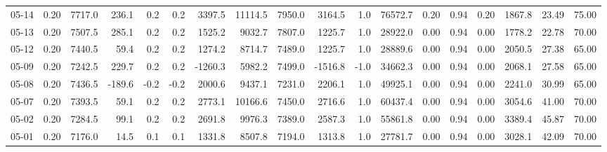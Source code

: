 \begin{threeparttable}
{\begin{tabular}{lrrrrrrrrrrrrrrrrr}
  05-14 &     0.20 & 7717.0 &             236.1 &               0.2 &                0.2 &             3397.5 & 11114.5 & 7950.0 &     3164.5 &                      1.0 &             76572.7 &       0.20 &      0.94 &           0.20 &           1867.8 &           23.49 &                  75.00 \\
  05-13 &     0.20 & 7507.5 &             285.1 &               0.2 &                0.2 &             1525.2 &  9032.7 & 7807.0 &     1225.7 &                      1.0 &             28922.0 &       0.00 &      0.94 &           0.00 &           1778.2 &           22.78 &                  70.00 \\
  05-12 &     0.20 & 7440.5 &              59.4 &               0.2 &                0.2 &             1274.2 &  8714.7 & 7489.0 &     1225.7 &                      1.0 &             28889.6 &       0.00 &      0.94 &           0.00 &           2050.5 &           27.38 &                  65.00 \\
  05-09 &     0.20 & 7242.5 &             229.7 &               0.2 &                0.2 &            -1260.3 &  5982.2 & 7499.0 &    -1516.8 &                     -1.0 &             34662.3 &       0.00 &      0.94 &           0.00 &           2068.1 &           27.58 &                  65.00 \\
  05-08 &     0.20 & 7436.5 &            -189.6 &              -0.2 &               -0.2 &             2000.6 &  9437.1 & 7231.0 &     2206.1 &                      1.0 &             49925.1 &       0.00 &      0.94 &           0.00 &           2241.0 &           30.99 &                  65.00 \\
  05-07 &     0.20 & 7393.5 &              59.1 &               0.2 &                0.2 &             2773.1 & 10166.6 & 7450.0 &     2716.6 &                      1.0 &             60437.4 &       0.00 &      0.94 &           0.00 &           3054.6 &           41.00 &                  70.00 \\
  05-02 &     0.20 & 7284.5 &              99.1 &               0.2 &                0.2 &             2691.8 &  9976.3 & 7389.0 &     2587.3 &                      1.0 &             55861.8 &       0.00 &      0.94 &           0.00 &           3389.4 &           45.87 &                  70.00 \\
  05-01 &     0.20 & 7176.0 &              14.5 &               0.1 &                0.1 &             1331.8 &  8507.8 & 7194.0 &     1313.8 &                      1.0 &             27781.7 &       0.00 &      0.94 &           0.00 &           3028.1 &           42.09 &                  70.00 \\

\end{tabular}}
\end{threeparttable}
